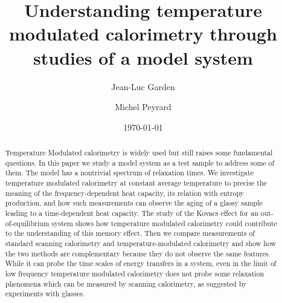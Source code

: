 \documentclass[pre,a4paper,twocolumn,superscriptaddress,%
floatfix]{revtex4}
\begin{document}
\title{Understanding temperature modulated calorimetry through studies of a
  model system} 


\author{Jean-Luc Garden}

\author{Michel Peyrard}

\date{\today}

\begin{abstract}
Temperature Modulated calorimetry is widely used but still raises some
fundamental questions. In this paper we study a model system as a test sample
to address some of them. The model has a nontrivial spectrum of relaxation
times. We investigate temperature modulated calorimetry at constant average
temperature to precise the meaning of the frequency-dependent heat capacity,
its relation with entropy production, and how such measurements can observe
the aging of a glassy sample leading to a time-dependent heat capacity.  The
study of the Kovacs effect for an out-of-equilibrium system shows how
temperature modulated calorimetry could contribute to the understanding of
this memory effect. Then we compare measurements of standard scanning
calorimetry and temperature-modulated calorimetry and show how the two
methods are complementary because they do not observe the same features. While
it can probe the time scales of energy transfers in a system, even in the
limit of low frequency temperature modulated calorimetry does not probe some
relaxation phenomena which can be measured by scanning calorimetry, as
suggested by experiments with glasses.

\end{abstract}

\maketitle
\end{document}

